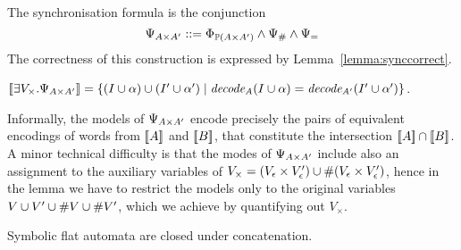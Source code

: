 \documentclass[sigplan,review,anonymous]{acmart}\settopmatter{printfolios=true,printccs=false,printacmref=false}
\begin{document}
The synchronisation formula is the conjunction 
$$\label{lemma:synccorrect}
\Psi_{A \times A'} ::= \Phi_{\mathbb{P}{(A \times A')}} \land \Psi_{\#} \land \Psi_=
$$
The correctness of this construction is expressed by Lemma~\ref{lemma:synccorrect}. 
%
\begin{lemma}
$[\![\exists V_\times . \Psi_{A \times A'}]\!] = \{(I\cup\alpha)\cup(I'\cup\alpha') \mid \mathit{decode_{A}}(I\cup\alpha) = \mathit{decode_{A'}}(I'\cup\alpha')\}$. 
\end{lemma}
%
Informally, the models of $\Psi_{A \times A'}$ encode precisely the pairs of equivalent encodings of words from $[\![A]\!]$ and $[\![B]\!]$, that constitute the intersection $[\![A]\!] \cap [\![B]\!]$. A minor technical difficulty is that the modes of $\Psi_{A \times A'}$ include also an assignment to the auxiliary variables of $V_\times = (V_\epsilon\times V'_\epsilon) \cup \#{(V_\epsilon\times V'_\epsilon)}$, hence in the lemma we have to restrict the models only to the original variables $V \cup V' \cup \#{V} \cup \#{V'}$, which we achieve by quantifying out $V_\times$.



\begin{lemma}
	Symbolic flat automata are closed under concatenation.
\end{lemma}
\end{document}
